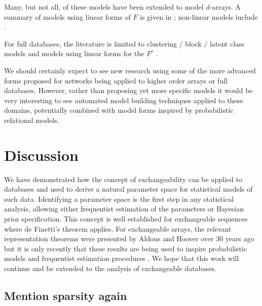 Many, but not all, of these models have been extended to model $d$-arrays.
A summary of models using linear forms of $F$ is given in \cite{Kolda2009-ba}; non-linear models include \cite{Xu2012-ub} .

For full databases, the literature is limited to clustering / block / latent class models \cite{Kemp2006-jt}  and models using linear forms for the $F^r$ \citep[e.g.][]{Lippert2008-gg, Singh2008-cb, Singh2008-qw, Jimeng2009-rw, Acar2011-vg, Gallinari2011-ac, Nickel2011-pi, Acar2012-no, Ermis2012-gk, Shangguan2012-ga, Singh2012-jj, Acar2013-na, Andersen2013-rg, Yin2013-we}.

We should certainly expect to see new research using some of the more advanced forms proposed for networks being applied to higher order arrays or full databases.
However, rather than proposing yet more specific models it would be very interesting to see automated model building techniques applied to these domains, potentially combined with model forms inspired by probabilistic relational models.

\section{Discussion}

We have demonstrated how the concept of exchangeability can be applied to databases and used to derive a natural parameter space for statistical models of such data.
Identifying a parameter space is the first step in any statistical analysis, allowing either frequentist estimation of the parameters or Bayesian prior specification.
This concept is well established for exchangeable sequences where de Finetti's theorem applies.
For exchangeable arrays, the relevant representation theorems were presented by Aldous and Hoover \cite{Aldous1981-lg, Hoover1979-br} over 30 years ago but it is only recently that these results are being used to inspire probabilistic models \cite{Hoff2007-ja, Roy2009-ge, Lloyd2012-sb} and frequentist estimation procedures \cite{Kallenberg1999-pj, Choi2013-th, Wolfe2013-vs}.
We hope that this work will continue and be extended to the analysis of exchangeable databases.

\subsection{Mention sparsity again}


\outbpdocument{


}
